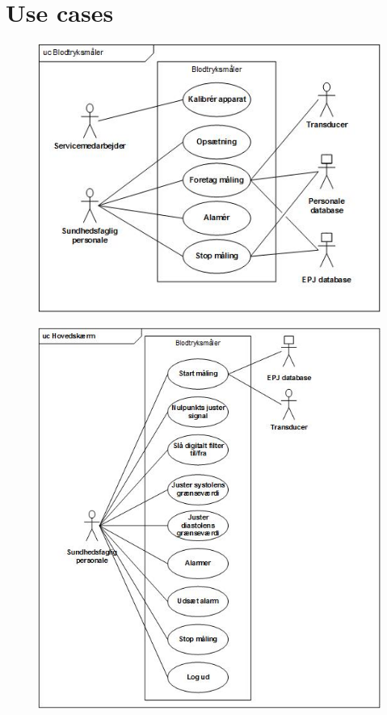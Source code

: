 \section{Use cases}
\begin{figure}[h!]
\includegraphics[width =1.0\textwidth , right]{billeder/UCStart}
\end{figure}
\begin{figure}[h!]
\includegraphics[width =1.0\textwidth , right]{billeder/UChoved}
\end{figure}
